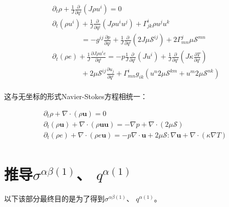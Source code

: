 \documentclass[LBMDerivation.tex]{subfiles}
\begin{document}
\begin{equation}
  \boxed{
    \begin{aligned}
       & \partial_{t} \rho+\frac{1}{J} \frac{\partial}{\partial q^{i}}\left(J \rho u^{i}\right)=0
      \\
       & \partial_{t}\left(\rho u^{i}\right)+\frac{1}{J} \frac{\partial}{\partial q^{j}}\left(J \rho u^{i} u^{j}\right)+\Gamma_{j k}^{i} \rho u^{j} u^{k} \\
       & \quad\quad\quad\quad =-g^{i j} \frac{\partial p}{\partial q^{j}}+ \frac{1}{J} \frac{\partial}{\partial q^i}(2J\mu \mathcal{S}^{ij}) + 2\Gamma_{mn}^j \mu \mathcal{S}^{mn}  \\
       & \partial_{t}\left(\rho e\right) + \frac{1}{J}\frac{\partial J \rho u^i e}{\partial  q^{i}} =-  p \frac{1}{J}  \frac{\partial}{\partial q^{i}}( J u^i) + \frac{1}{J} \frac{\partial}{\partial q^i} ( J \kappa \frac{\partial T}{\partial q^i} ) \\
       & \quad\quad\quad\quad  + 2\mu \mathcal{S}^{ij} \frac{\partial u_j}{\partial q^i} + \Gamma_{mn}^i g_{ik}(u^n 2\mu\mathcal{S}^{km} + u^m 2\mu\mathcal{S}^{nk} )   \\
    \end{aligned}
  }
\end{equation}


这与无坐标的形式Navier-Stokes方程相统一：


\begin{equation}
  \begin{aligned}
     & \partial_t \rho + \nabla \cdot (\rho \boldsymbol{u})=0                                                      \\
     & \partial_{t}\left(\rho \boldsymbol{u} \right)+ \nabla \cdot (\rho \boldsymbol{u} \boldsymbol{u}) = -\nabla p + \nabla \cdot ( 2\mu \mathcal{S}) \\
     & \partial_{t}\left(\rho e \right) + \nabla \cdot (\rho e \boldsymbol{u})= -p \nabla \cdot \boldsymbol{u} + 2\mu \mathcal{S}:\nabla \boldsymbol{u}    +  \nabla \cdot(\kappa \nabla T) \\
  \end{aligned}
  \label{EQUATION::Eluer2} ~
\end{equation}
%


\appendix
\chapter{推导$\sigma^{\alpha\beta(1)}$、 $q^{\alpha (1)}$}
以下该部分最终目的是为了得到$\sigma^{\alpha\beta(1)}$、 $q^{\alpha (1)}$。
\end{document}
